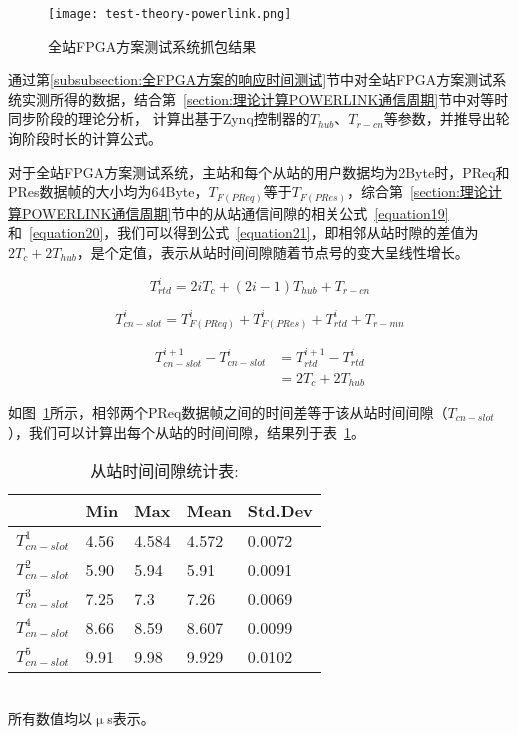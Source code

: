 \begin{figure}[!htb]
  \centering
  \texttt{[image: test-theory-powerlink.png]}
  \caption{全站FPGA方案测试系统抓包结果}
  \label{fig:test-theory-powerlink}
\end{figure}

通过第\ref{subsubsection:全FPGA方案的响应时间测试}节中对全站FPGA方案测试系统实测所得的数据，结合第~\ref{section:理论计算POWERLINK通信周期}节中对等时同步阶段的理论分析，
计算出基于Zynq控制器的$T_{hub}$、$T_{r-cn}$等参数，并推导出轮询阶段时长的计算公式。

对于全站FPGA方案测试系统，主站和每个从站的用户数据均为2Byte时，PReq和PRes数据帧的大小均为64Byte，$T_{F(PReq)}$等于$T_{F(PRes)}$，综合第~\ref{section:理论计算POWERLINK通信周期}节中的从站通信间隙的相关公式~\ref{equation19}和~\ref{equation20}，我们可以得到公式~\ref{equation21}，即相邻从站时隙的差值为$2T_{c}+2T_{hub}$，是个定值，表示从站时间间隙随着节点号的变大呈线性增长。

\begin{equation}
\label{equation19}
T_{rtd}^{i}=2iT_{c}+(2i-1)T_{hub}+T_{r-cn}
\end{equation}

\begin{equation}
\label{equation20}
T_{cn-slot}^{i}=T_{F(PReq)}^{i}+T_{F(PRes)}^{i}+T_{rtd}^{i}+T_{r-mn}
\end{equation}

\begin{equation}
\begin{split}
\label{equation21}
T_{cn-slot}^{i+1}-T_{cn-slot}^{i}&=T_{rtd}^{i+1}-T_{rtd}^{i}\\
&=2T_{c}+2T_{hub}
\end{split}
\end{equation}

如图~\ref{fig:test-theory-powerlink}所示，相邻两个PReq数据帧之间的时间差等于该从站时间间隙（$T_{cn-slot}$），我们可以计算出每个从站的时间间隙，结果列于表~\ref{table:3.1}。

\begin{table}[hbtp]
  \centering
  \caption{从站时间间隙统计表:}
  \begin{tabular}{p{70 pt}p{70 pt}p{70 pt}p{70 pt}p{70 pt}}
    \toprule
    & Min & Max & Mean & Std.Dev\\
    \midrule
    $T_{cn-slot}^{1}$ & 4.56 & 4.584 & 4.572 & 0.0072\\
    $T_{cn-slot}^{2}$ & 5.90 & 5.94 & 5.91 & 0.0091\\
    $T_{cn-slot}^{3}$ & 7.25 & 7.3 & 7.26 & 0.0069\\
    $T_{cn-slot}^{4}$ & 8.66 & 8.59 & 8.607 & 0.0099\\
    $T_{cn-slot}^{5}$ & 9.91 & 9.98 & 9.929 & 0.0102\\
    \bottomrule
  \end{tabular}
  \\
  \footnotesize{所有数值均以$\upmu$s表示。}
  \label{table:3.1}
\end{table}


